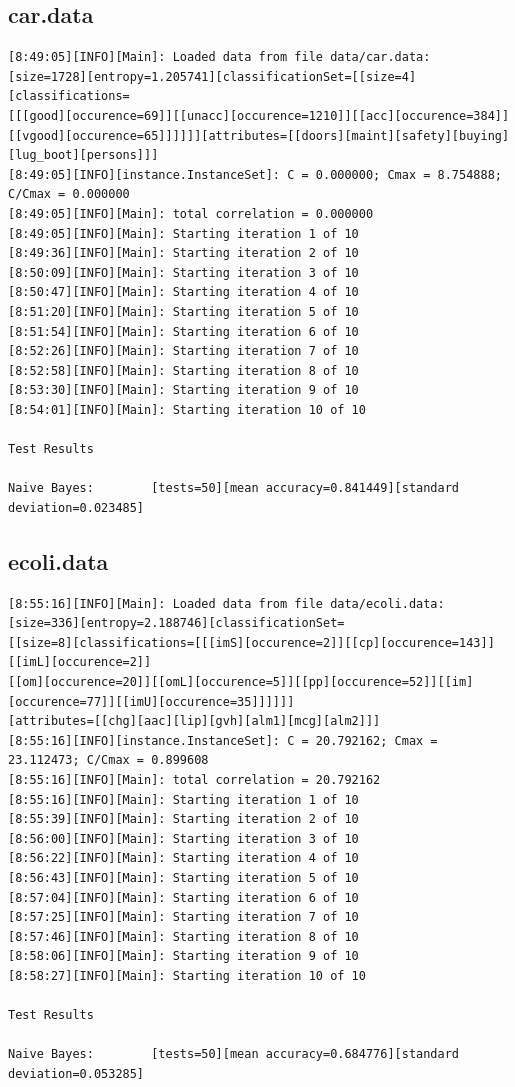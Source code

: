 \documentclass[10pt]{report}
\begin{document}
\subsection*{car.data}
{\small
\begin{verbatim}
[8:49:05][INFO][Main]: Loaded data from file data/car.data:
[size=1728][entropy=1.205741][classificationSet=[[size=4][classifications=
[[[good][occurence=69]][[unacc][occurence=1210]][[acc][occurence=384]]
[[vgood][occurence=65]]]]]][attributes=[[doors][maint][safety][buying][lug_boot][persons]]] 
[8:49:05][INFO][instance.InstanceSet]: C = 0.000000; Cmax = 8.754888; C/Cmax = 0.000000 
[8:49:05][INFO][Main]: total correlation = 0.000000 
[8:49:05][INFO][Main]: Starting iteration 1 of 10 
[8:49:36][INFO][Main]: Starting iteration 2 of 10 
[8:50:09][INFO][Main]: Starting iteration 3 of 10 
[8:50:47][INFO][Main]: Starting iteration 4 of 10 
[8:51:20][INFO][Main]: Starting iteration 5 of 10 
[8:51:54][INFO][Main]: Starting iteration 6 of 10 
[8:52:26][INFO][Main]: Starting iteration 7 of 10 
[8:52:58][INFO][Main]: Starting iteration 8 of 10 
[8:53:30][INFO][Main]: Starting iteration 9 of 10 
[8:54:01][INFO][Main]: Starting iteration 10 of 10 

Test Results

Naive Bayes:		[tests=50][mean accuracy=0.841449][standard deviation=0.023485] 
\end{verbatim}
}


\subsection*{ecoli.data}
{\small
\begin{verbatim}
[8:55:16][INFO][Main]: Loaded data from file data/ecoli.data:
[size=336][entropy=2.188746][classificationSet=
[[size=8][classifications=[[[imS][occurence=2]][[cp][occurence=143]][[imL][occurence=2]]
[[om][occurence=20]][[omL][occurence=5]][[pp][occurence=52]][[im][occurence=77]][[imU][occurence=35]]]]]]
[attributes=[[chg][aac][lip][gvh][alm1][mcg][alm2]]] 
[8:55:16][INFO][instance.InstanceSet]: C = 20.792162; Cmax = 23.112473; C/Cmax = 0.899608 
[8:55:16][INFO][Main]: total correlation = 20.792162 
[8:55:16][INFO][Main]: Starting iteration 1 of 10 
[8:55:39][INFO][Main]: Starting iteration 2 of 10 
[8:56:00][INFO][Main]: Starting iteration 3 of 10 
[8:56:22][INFO][Main]: Starting iteration 4 of 10 
[8:56:43][INFO][Main]: Starting iteration 5 of 10 
[8:57:04][INFO][Main]: Starting iteration 6 of 10 
[8:57:25][INFO][Main]: Starting iteration 7 of 10 
[8:57:46][INFO][Main]: Starting iteration 8 of 10 
[8:58:06][INFO][Main]: Starting iteration 9 of 10 
[8:58:27][INFO][Main]: Starting iteration 10 of 10 

Test Results

Naive Bayes:		[tests=50][mean accuracy=0.684776][standard deviation=0.053285] 
\end{verbatim}
}
\end{document}
